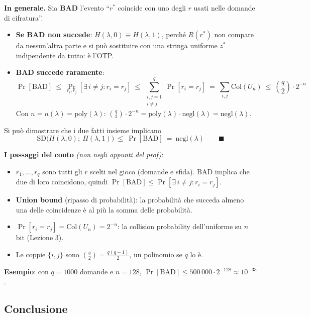 \textbf{In generale.} Sia \textbf{BAD} l'evento ``\(r^*\) coincide con uno degli \(r\) usati nelle domande di cifratura''.
\begin{itemize}
  \item \textbf{Se BAD non succede}: \(H(\lambda, 0) \equiv H(\lambda, 1)\), perché \(R(r^*)\) non compare da nessun'altra parte e si può sostituire con una stringa uniforme \(z^*\) indipendente da tutto: è l'OTP.
  \item \textbf{BAD succede raramente}:
  \[
  \Pr[\text{BAD}] \ \le\ \Pr_{r_i, r_j}[\exists\, i \ne j : r_i = r_j] \ \le\ \sum_{\substack{i, j = 1 \\ i \ne j}}^{q} \Pr[r_i = r_j] \ =\ \sum_{i, j} \text{Col}(U_n) \ \le\ \binom{q}{2} \cdot 2^{-n}
  \]
  Con \(n = n(\lambda) = \text{poly}(\lambda)\): \(\binom{q}{2} \cdot 2^{-n} = \text{poly}(\lambda) \cdot \text{negl}(\lambda) = \text{negl}(\lambda)\).
\end{itemize}

Si può dimostrare che i due fatti insieme implicano
\[
\text{SD}\big(H(\lambda, 0);\ H(\lambda, 1)\big) \ \le\ \Pr[\text{BAD}] \ =\ \text{negl}(\lambda) \qquad \blacksquare
\]

\begin{nota}
\textbf{I passaggi del conto} \emph{(non negli appunti del prof)}:
\begin{itemize}
  \item \(r_1, \dots, r_q\) sono tutti gli \(r\) scelti nel gioco (domande e sfida). BAD implica che due di loro coincidono, quindi \(\Pr[\text{BAD}] \le \Pr[\exists\, i \ne j: r_i = r_j]\).
  \item \textbf{Union bound} (ripasso di probabilità): la probabilità che succeda almeno una delle coincidenze è al più la somma delle probabilità.
  \item \(\Pr[r_i = r_j] = \text{Col}(U_n) = 2^{-n}\): la collision probability dell'uniforme su \(n\) bit (Lezione 3).
  \item Le coppie \(\{i, j\}\) sono \(\binom{q}{2} = \frac{q(q-1)}{2}\), un polinomio se \(q\) lo è.
\end{itemize}
\textbf{Esempio}: con \(q = 1000\) domande e \(n = 128\), \(\Pr[\text{BAD}] \le 500\,000 \cdot 2^{-128} \approx 10^{-33}\).
\end{nota}

\subsection{Conclusione}

